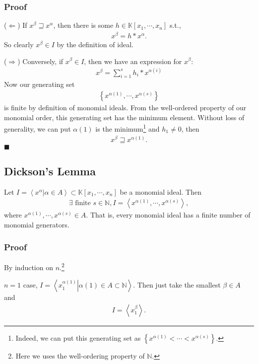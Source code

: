 \documentclass[11pt]{book}
\begin{document}
\subsubsection{Proof}
($\Leftarrow$)
If $x^\beta \sqsupseteq x^\alpha$, then there is some $h \in \mathbb{K}[x_1, \cdots, x_n]$ s.t.,
\begin{eqnarray}
x^\beta = h * x^\alpha.
\end{eqnarray}
So clearly $x^\beta \in I$ by the definition of ideal.

($\Rightarrow$)
Conversely, if $x^\beta \in I$, then we have an expression for $x^\beta$:
\begin{eqnarray}
x^\beta = \sum_{i=1}^s h_i * x^{\alpha(i)}
\end{eqnarray}
Now our generating set
\begin{eqnarray}
\left\{x^{\alpha(1)}, \cdots, x^{\alpha(s)} \right\}
\end{eqnarray}
is finite by definition of monomial ideals.
From the well-ordered property of our monomial order, this generating set has the minimum element.
Without loss of generality, we can put $\alpha(1)$ is the minimum\footnote{Indeed, we can put this generating set as $\left\{x^{\alpha(1)}< \cdots < x^{\alpha(s)} \right\}$.} and $h_1 \neq 0$, then
\begin{eqnarray}
x^\beta \sqsupseteq x^{\alpha(1)}.
\end{eqnarray}
$\blacksquare$

\subsection{Dickson's Lemma}
\label{Dickson}
Let $I = \left<\left. x^\alpha \right| \alpha \in A\right> \subset \mathbb{K}[x_1, \cdots, x_n]$ be a monomial ideal.
Then
\begin{eqnarray}
\exists \text{ finite } s \in \mathbb{N}, I = \left<x^{\alpha(1)}, \cdots, x^{\alpha(s)} \right>,
\end{eqnarray}
where $x^{\alpha(1)}, \cdots, x^{\alpha(s)} \in A$.
That is, every monomial ideal has a finite number of monomial generators.

\subsubsection{Proof}
By induction on $n$.\footnote{Here we uses the well-ordering property of $\mathbb{N}$.}

$n=1$ case, $I = \left<\left. x_1^{\alpha(1)} \right| {\alpha(1)} \in A \subset \mathbb{N} \right>$.
Then just take the smallest $\beta \in A$ and 
\begin{eqnarray}
I = \left< x_1^\beta \right>.
\end{eqnarray}
\end{document}
